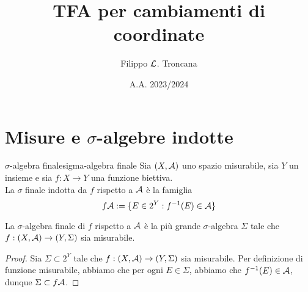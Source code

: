 \documentclass{article}
\title{TFA per cambiamenti di coordinate}
\author{Filippo $\mathcal{L}$. Troncana}
\date{A.A. 2023/2024}
\begin{document}
\maketitle

\section{Misure e $\sigma$-algebre indotte}

\begin{definition}{$\sigma$-algebra finale}{sigma-algebra finale}
    Sia $(X,\mathcal{A})$ uno spazio misurabile, sia $Y$ un insieme e sia $f:X\to Y$ una funzione biettiva.\\
    La $\sigma$ finale indotta da $f$ rispetto a $\mathcal{A}$ è la famiglia
    \[f\mathcal{A} := \{E \in 2^Y : f^{-1}(E) \in \mathcal{A}\}\]
\end{definition}
\begin{remark}{}{}
    La $\sigma$-algebra finale di $f$ rispetto a $\mathcal{A}$ è la più grande $\sigma$-algebra $\Sigma$ tale che $f : (X,\mathcal{A})\to (Y,\Sigma)$ sia misurabile.
    \begin{proof}
        Sia $\Sigma \subset 2^Y$ tale che $f : (X,\mathcal{A})\to (Y,\Sigma)$ sia misurabile. Per definizione di funzione misurabile, abbiamo che per ogni $E \in \Sigma$, abbiamo che $f^{-1}(E)\in \mathcal{A}$, dunque $\Sigma\subset f\mathcal{A}$.
    \end{proof}
\end{remark}
\end{document}
